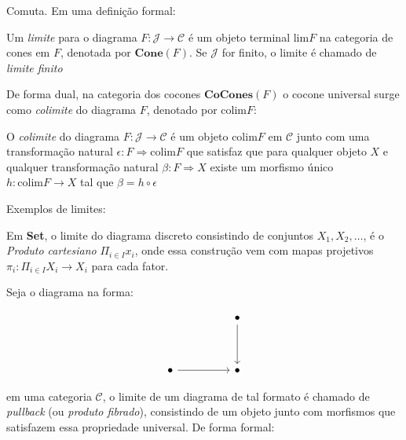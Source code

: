 \documentclass[../main.tex]{subfiles}
\begin{document}
Comuta. Em uma definição formal:

\begin{definition}
    Um \emph{limite} para o diagrama $F : \mathcal{J} \to \mathcal{C}$ é um objeto terminal $\text{lim} F$ na categoria de cones em $F$, denotada por $\textbf{Cone}(F)$. Se $\mathcal{J}$ for finito, o limite é chamado de \emph{limite finito}
\end{definition}

De forma dual, na categoria dos cocones $\textbf{CoCones}(F)$ o cocone universal surge como \emph{colimite} do diagrama $F$, denotado por $\text{colim} F$:

\begin{definition}
    O \emph{colimite} do diagrama $F : \mathcal{J} \to \mathcal{C}$ é um objeto $\text{colim} F$ em $\mathcal{C}$ junto com uma transformação natural $\epsilon : F \Rightarrow \text{colim} F$ que satisfaz que para qualquer objeto $X$ e qualquer transformação natural $\beta : F \Rightarrow X$ existe um morfismo único $h : \text{colim} F \to X$ tal que $\beta = h \circ \epsilon$
\end{definition}

Exemplos de limites:

Em \textbf{Set}, o limite do diagrama discreto consistindo de conjuntos $X_1, X_2, \dots$, é o \emph{Produto cartesiano} $\Pi_{i \in I} x_i$, onde essa construção vem com mapas projetivos $\pi_i : \Pi_{i \in I} X_i \to X_i$ para cada fator.

Seja o diagrama na forma:

\[\begin{tikzcd}
	&& \bullet \\
	\\
	\bullet && \bullet
	\arrow[from=1-3, to=3-3]
	\arrow[from=3-1, to=3-3]
\end{tikzcd}\]

em uma categoria $\mathcal{C}$, o limite de um diagrama de tal formato é chamado de \emph{pullback} (ou \emph{produto fibrado}), consistindo de um objeto junto com morfismos que satisfazem essa propriedade universal. De forma formal:
\end{document}
